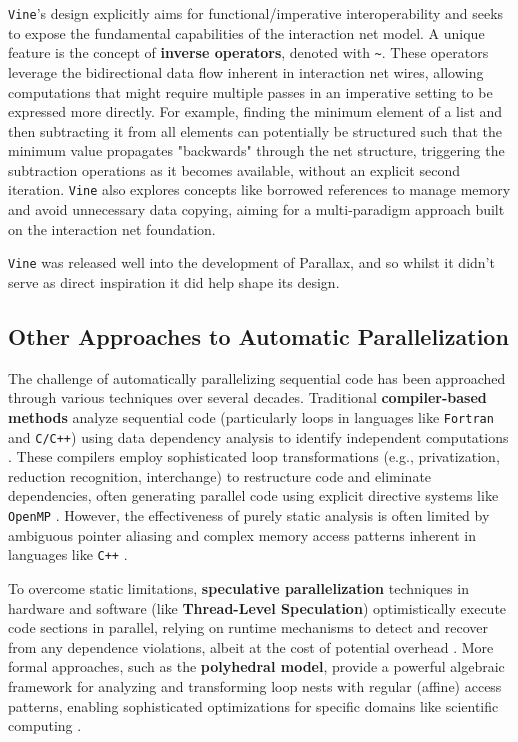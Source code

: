 \texttt{Vine}'s design explicitly aims for functional/imperative interoperability and seeks to expose the fundamental capabilities of the interaction net model. A unique feature is the concept of \textbf{inverse operators}, denoted with \texttt{\textasciitilde{}}. These operators leverage the bidirectional data flow inherent in interaction net wires, allowing computations that might require multiple passes in an imperative setting to be expressed more directly. For example, finding the minimum element of a list and then subtracting it from all elements can potentially be structured such that the minimum value propagates "backwards" through the net structure, triggering the subtraction operations as it becomes available, without an explicit second iteration. \texttt{Vine} also explores concepts like borrowed references to manage memory and avoid unnecessary data copying, aiming for a multi-paradigm approach built on the interaction net foundation.

\texttt{Vine} was released well into the development of Parallax, and so whilst it didn't serve as direct inspiration it did help shape its design.

\subsection{Other Approaches to Automatic Parallelization}

The challenge of automatically parallelizing sequential code has been approached through various techniques over several decades. Traditional \textbf{compiler-based methods} analyze sequential code (particularly loops in languages like \texttt{Fortran} and \texttt{C/C++}) using data dependency analysis to identify independent computations \cite{KennedyAllen2001OptimizingCompilers}. These compilers employ sophisticated loop transformations (e.g., privatization, reduction recognition, interchange) to restructure code and eliminate dependencies, often generating parallel code using explicit directive systems like \texttt{OpenMP} \cite{OpenMPARBP2018OpenMPSpecification}. However, the effectiveness of purely static analysis is often limited by ambiguous pointer aliasing and complex memory access patterns inherent in languages like \texttt{C++} \cite{Allen1983DependenceAnalysis}.

To overcome static limitations, \textbf{speculative parallelization} techniques in hardware and software (like \textbf{Thread-Level Speculation}) optimistically execute code sections in parallel, relying on runtime mechanisms to detect and recover from any dependence violations, albeit at the cost of potential overhead \cite{Rauchwerger1995RunTime}. More formal approaches, such as the \textbf{polyhedral model}, provide a powerful algebraic framework for analyzing and transforming loop nests with regular (affine) access patterns, enabling sophisticated optimizations for specific domains like scientific computing \cite{Bondhugula2008AutomaticDistributedMemory}.

